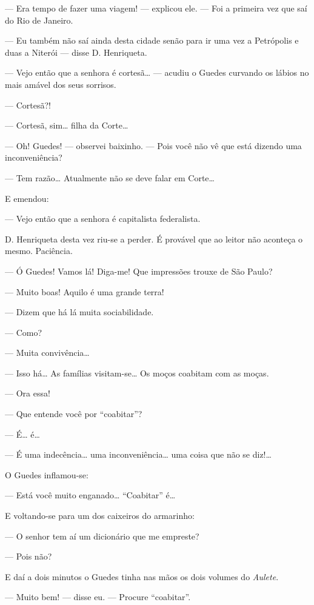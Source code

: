 --- Era tempo de fazer uma viagem! --- explicou ele. --- Foi a primeira
vez que saí do Rio de Janeiro.

--- Eu também não saí ainda desta cidade senão para ir uma vez a
Petrópolis e duas a Niterói --- disse D. Henriqueta.

--- Vejo então que a senhora é cortesã\ldots{} --- acudiu o Guedes curvando
os lábios no mais amável dos seus sorrisos.

--- Cortesã?!

--- Cortesã, sim\ldots{} filha da Corte\ldots{}

--- Oh! Guedes! --- observei baixinho. --- Pois você não vê que está
dizendo uma inconveniência?

--- Tem razão\ldots{} Atualmente não se deve falar em Corte\ldots{}

E emendou:

--- Vejo então que a senhora é capitalista federalista.

D. Henriqueta desta vez riu-se a perder. É provável que ao leitor não
aconteça o mesmo. Paciência.

--- Ó Guedes! Vamos lá! Diga-me! Que impressões trouxe de São Paulo?

--- Muito boas! Aquilo é uma grande terra!

--- Dizem que há lá muita sociabilidade.

--- Como?

--- Muita convivência\ldots{}

--- Isso há\ldots{} As famílias visitam-se\ldots{} Os moços coabitam com as moças.

--- Ora essa!

--- Que entende você por ``coabitar''?

--- É\ldots{} é\ldots{}

--- É uma indecência\ldots{} uma inconveniência\ldots{} uma coisa que não se
diz!\ldots{}

O Guedes inflamou-se:

--- Está você muito enganado\ldots{} ``Coabitar'' é\ldots{}

E voltando-se para um dos caixeiros do armarinho:

--- O senhor tem aí um dicionário que me empreste?

--- Pois não?

E daí a dois minutos o Guedes tinha nas mãos os dois volumes do
\emph{Aulete}.

--- Muito bem! --- disse eu. --- Procure ``coabitar''.

